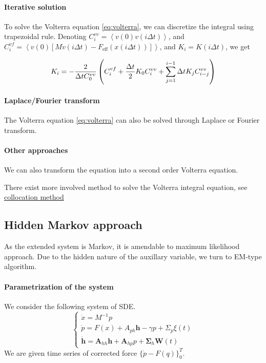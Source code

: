 \documentclass{article}
\numberwithin{equation}{section} %
\newcommand{\f}[2]{\mathchoice%
			{\dfrac{#1}{#2}}
	    	{\dfrac{#1}{#2}}
			{\frac{#1}{#2}}
			{\frac{#1}{#2}}}
\newcommand{\avg}[1]{\ensuremath{\left\langle #1 \right\rangle}}
\newcommand{\1}{\mathds{1}} %
\begin{document}
\paragraph{Iterative solution}
To solve the Volterra equation \eqref{eq:volterra}, we can discretize the integral using trapezoidal rule. Denoting $C_i^{vv} = \avg{v(0)v(i\Delta t)}$, and $C_i^{vf}= \avg{v(0) [M \dot{v} (i\Delta t) - F_\text{eff}(x(i\Delta t))]}$, and $K_i = K(i\Delta t)$, we get

\begin{equation}
    \label{eq:iterative_volterra}
    K_i = -\f{2}{\Delta t C_0^{vv}} \left( C_i^{vf} + \f{\Delta t}{2} K_0 C_{i}^{vv} +\sum_{j=1}^{i-1} \Delta t K_j C_{i-j}^{vv} \right)
\end{equation}


\paragraph{Laplace/Fourier transform}
The Volterra equation \eqref{eq:volterra} can also be solved through Laplace or Fourier transform.

\paragraph{Other approaches}
We can also transform the equation into a second order Volterra equation.

There exist more involved method to solve the Volterra integral equation, see \href{http://www.math.hkbu.edu.hk/~hbrunner/harbin10/HL1.pdf}{collocation method}

\subsection{Hidden Markov approach}

As the extended system is Markov, it is amendable to maximum likelihood approach. Due to the hidden nature of the auxillary variable, we turn to EM-type algorithm. 

\paragraph{Parametrization of the system}
We consider the following system of SDE.
\begin{equation}
    \label{eq:parameters}
    \begin{cases}
    \dot x = M^{-1} p \\
    \dot p = F(x)+ A_{ph} \bm{h}  -\gamma p + \Sigma_p \xi(t)  \\
   \dot{\bm{h}} = \bm{A}_{hh} \bm{h}+ \bm{A}_{hp} p + \bm{\Sigma}_h \bm{W}(t)
\end{cases}
\end{equation}
We are given time series of corrected force $ \{\dot p-F(q)\}_0^T$.
\end{document}
